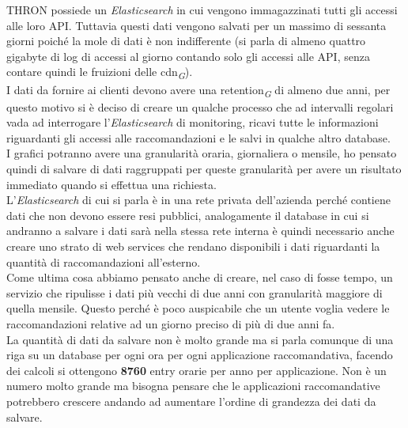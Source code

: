\documentclass[a4paper, 12pt, twoside, openright]{book}
\newcommand{\gloss}[1]{#1\textsubscript{\textit{\tiny{G}}}}
\begin{document}
THRON possiede un \textit{Elasticsearch} in cui vengono immagazzinati tutti gli accessi alle loro API. Tuttavia questi dati vengono salvati per un massimo di sessanta giorni poiché la mole di dati è non indifferente (si parla di almeno quattro gigabyte di log di accessi al giorno contando solo gli accessi alle API, senza contare quindi le fruizioni delle \gloss{cdn}).\\
I dati da fornire ai clienti devono avere una \gloss{retention} di almeno due anni, per questo motivo si è deciso di creare un qualche processo che ad intervalli regolari vada ad interrogare l'\textit{Elasticsearch} di monitoring, ricavi tutte le informazioni riguardanti gli accessi alle raccomandazioni e le salvi in qualche altro database.\\
I grafici potranno avere una granularità oraria, giornaliera o mensile, ho pensato quindi di salvare di dati raggruppati per queste granularità per avere un risultato immediato quando si effettua una richiesta.\\
L'\textit{Elasticsearch} di cui si parla è in una rete privata dell'azienda perché contiene dati che non devono essere resi pubblici, analogamente il database in cui si andranno a salvare i dati sarà nella stessa rete interna è quindi necessario anche creare uno strato di web services che rendano disponibili i dati riguardanti la quantità di raccomandazioni all'esterno.\\

Come ultima cosa abbiamo pensato anche di creare, nel caso di fosse tempo, un servizio che ripulisse i dati più vecchi di due anni con granularità maggiore di quella mensile. Questo perché è poco auspicabile che un utente voglia vedere le raccomandazioni relative ad un giorno preciso di più di due anni fa.\\
La quantità di dati da salvare non è molto grande ma si parla comunque di una riga su un database per ogni ora per ogni applicazione raccomandativa, facendo dei calcoli si ottengono \textbf{8760} entry orarie per anno per applicazione. Non è un numero molto grande ma bisogna pensare che le applicazioni raccomandative potrebbero crescere andando ad aumentare l'ordine di grandezza dei dati da salvare.\\
\end{document}
